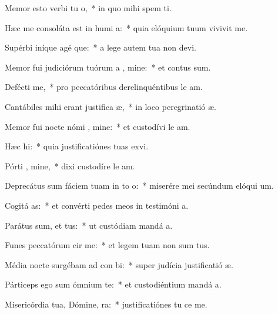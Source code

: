 \item Memor esto verbi tu  o,~* in quo mihi spem ti.
\item Hæc me consoláta est in humi a:~* quia elóquium tuum vivivit me.
\item Supérbi iníque agé que:~* a lege autem tua non devi.
\item Memor fui judiciórum tuórum a , mine:~* et contus sum.
\item Defécti  me,~* pro peccatóribus derelinquéntibus le am.
\item Cantábiles mihi erant justifica æ,~* in loco peregrinatió æ.
\item Memor fui nocte nómi , mine:~* et custodívi le am.
\item Hæc   hi:~* quia justificatiónes tuas exvi.
\item Pórti , mine,~* dixi custodíre le am.
\item Deprecátus sum fáciem tuam in to  o:~* miserére mei secúndum elóqui um.
\item Cogitá  as:~* et convérti pedes meos in testimóni a.
\item Parátus sum, et   tus:~* ut custódiam mandá a.
\item Funes peccatórum cir  me:~* et legem tuam non sum tus.
\item Média nocte surgébam ad con bi:~* super judícia justificatió æ.
\item Párticeps ego sum ómnium  te:~* et custodiéntium mandá a.
\item Misericórdia tua, Dómine,   ra:~* justificatiónes tu ce me.
